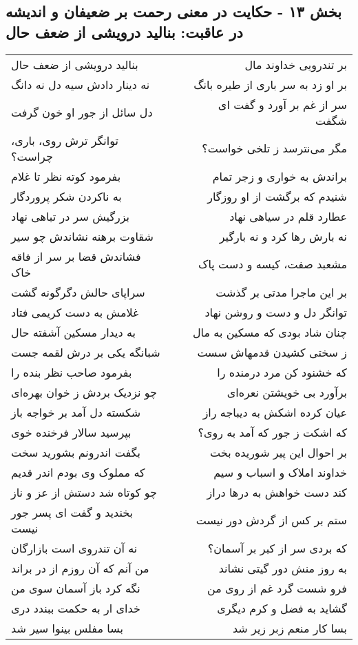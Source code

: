 \begin{center}
\section*{بخش ۱۳ - حکایت در معنی رحمت بر ضعیفان و اندیشه در عاقبت: بنالید درویشی از ضعف حال}
\label{sec:013}
\begin{longtable}{l p{0.5cm} r}
بنالید درویشی از ضعف حال
&&
بر تندرویی خداوند مال
\\
نه دینار دادش سیه دل نه دانگ
&&
بر او زد به سر باری از طیره بانگ
\\
دل سائل از جور او خون گرفت
&&
سر از غم بر آورد و گفت ای شگفت
\\
توانگر ترش روی، باری، چراست؟
&&
مگر می‌نترسد ز تلخی خواست؟
\\
بفرمود کوته نظر تا غلام
&&
براندش به خواری و زجر تمام
\\
به ناکردن شکر پروردگار
&&
شنیدم که برگشت از او روزگار
\\
بزرگیش سر در تباهی نهاد
&&
عطارد قلم در سیاهی نهاد
\\
شقاوت برهنه نشاندش چو سیر
&&
نه بارش رها کرد و نه بارگیر
\\
فشاندش قضا بر سر از فاقه خاک
&&
مشعبد صفت، کیسه و دست پاک
\\
سراپای حالش دگرگونه گشت
&&
بر این ماجرا مدتی بر گذشت
\\
غلامش به دست کریمی فتاد
&&
توانگر دل و دست و روشن نهاد
\\
به دیدار مسکین آشفته حال
&&
چنان شاد بودی که مسکین به مال
\\
شبانگه یکی بر درش لقمه جست
&&
ز سختی کشیدن قدمهاش سست
\\
بفرمود صاحب نظر بنده را
&&
که خشنود کن مرد درمنده را
\\
چو نزدیک بردش ز خوان بهره‌ای
&&
برآورد بی خویشتن نعره‌ای
\\
شکسته دل آمد بر خواجه باز
&&
عیان کرده اشکش به دیباجه راز
\\
بپرسید سالار فرخنده خوی
&&
که اشکت ز جور که آمد به روی؟
\\
بگفت اندرونم بشورید سخت
&&
بر احوال این پیر شوریده بخت
\\
که مملوک وی بودم اندر قدیم
&&
خداوند املاک و اسباب و سیم
\\
چو کوتاه شد دستش از عز و ناز
&&
کند دست خواهش به درها دراز
\\
بخندید و گفت ای پسر جور نیست
&&
ستم بر کس از گردش دور نیست
\\
نه آن تندروی است بازارگان
&&
که بردی سر از کبر بر آسمان؟
\\
من آنم که آن روزم از در براند
&&
به روز منش دور گیتی نشاند
\\
نگه کرد باز آسمان سوی من
&&
فرو شست گرد غم از روی من
\\
خدای ار به حکمت ببندد دری
&&
گشاید به فضل و کرم دیگری
\\
بسا مفلس بینوا سیر شد
&&
بسا کار منعم زبر زیر شد
\\
\end{longtable}
\end{center}
